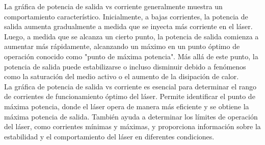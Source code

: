 \documentclass[
	12pt, %
	fleqn, %
	a4paper, %
	oneside, %
]{LegrandOrangeBook}
\begin{document}
La gráfica de potencia de salida vs corriente generalmente muestra un comportamiento característico. Inicialmente, a bajas corrientes, la potencia de salida aumenta gradualmente a medida que se inyecta más corriente en el láser. Luego, a medida que se alcanza un cierto punto, la potencia de salida comienza a aumentar más rápidamente, alcanzando un máximo en un punto óptimo de operación conocido como "punto de máxima potencia". Más allá de este punto, la potencia de salida puede estabilizarse o incluso disminuir debido a fenómenos como la saturación del medio activo o el aumento de la disipación de calor. \\
La gráfica de potencia de salida vs corriente es esencial para determinar el rango de corrientes de funcionamiento óptimo del láser. Permite identificar el punto de máxima potencia, donde el láser opera de manera más eficiente y se obtiene la máxima potencia de salida. También ayuda a determinar los límites de operación del láser, como corrientes mínimas y máximas, y proporciona información sobre la estabilidad y el comportamiento del láser en diferentes condiciones.
\end{document}
